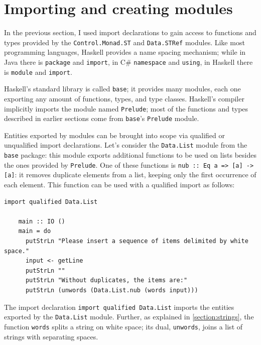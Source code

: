 \documentclass[UdineBachThesis,american,11pt]{PhdThesis}
\begin{document}
  \section{Importing and creating modules}

  In the previous section, I used import declarations to gain access to
  functions and types provided by the \mbox{\texttt{Control.Monad.ST}} and
  \mbox{\texttt{Data.STRef}} modules. Like most programming languages, Haskell
  provides a name spacing mechanism; while in Java there is
  \mbox{\texttt{package}} and \mbox{\texttt{import}}, in C\#
  \mbox{\texttt{namespace}} and \mbox{\texttt{using}}, in Haskell there is
  \mbox{\texttt{module}} and \mbox{\texttt{import}}.

  Haskell's standard library is called \mbox{\texttt{base}}; it provides many
  modules, each one exporting any amount of functions, types, and type classes.
  Haskell's compiler implicitly imports the module named
  \mbox{\texttt{Prelude}}; most of the functions and types described in earlier
  sections come from \mbox{\texttt{base}}'s \mbox{\texttt{Prelude}} module.

  Entities exported by modules can be brought into scope via qualified or
  unqualified import declarations. Let's consider the \mbox{\texttt{Data.List}}
  module from the \mbox{\texttt{base}} package: this module exports additional
  functions to be used on lists besides the ones provided by
  \mbox{\texttt{Prelude}}. One of these functions is
  \mbox{\texttt{nub :: Eq a => [a] -> [a]}}: it removes duplicate elements from
  a list, keeping only the first occurrence of each element. This function can
  be used with a qualified import as follows:

  \pagebreak

  \begin{Verbatim}[gobble=4,fontsize=\small]
    import qualified Data.List

    main :: IO ()
    main = do
      putStrLn "Please insert a sequence of items delimited by white space."
      input <- getLine
      putStrLn ""
      putStrLn "Without duplicates, the items are:"
      putStrLn (unwords (Data.List.nub (words input)))
  \end{Verbatim}

  The import declaration \mbox{\texttt{import qualified Data.List}} imports the
  entities exported by the \mbox{\texttt{Data.List}} module. Further, as
  explained in \autoref{section:strings}, the function \mbox{\texttt{words}}
  splits a string on white space; its dual, \mbox{\texttt{unwords}}, joins a
  list of strings with separating spaces.
\end{document}
